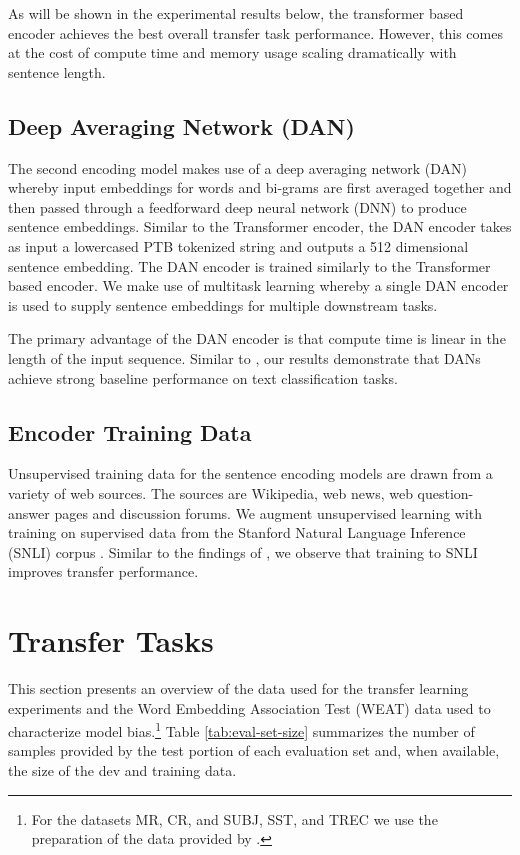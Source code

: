 \documentclass[11pt,a4paper]{article}
\begin{document}
As will be shown in the experimental results below, the transformer based encoder achieves the best overall transfer task performance. However, this comes at the cost of compute time and memory usage scaling dramatically with sentence length. 



\subsection{Deep Averaging Network (DAN)}

The second encoding model makes use of a deep averaging network (DAN) \cite{iyyer2015} whereby input embeddings for words and bi-grams are first averaged together and then passed through a feedforward deep neural network (DNN) to produce sentence embeddings.  
Similar to the Transformer encoder, the DAN encoder takes as input a lowercased PTB tokenized string and outputs a 512 dimensional sentence embedding. The DAN encoder is trained similarly to the Transformer based encoder. We make use of multitask learning whereby a single DAN encoder is used to supply sentence embeddings for multiple downstream tasks.

The primary advantage of the DAN encoder is that compute time is linear in the length of the input sequence. Similar to , our results demonstrate that DANs achieve strong baseline performance on text classification tasks. 


\subsection{Encoder Training Data}

Unsupervised training data for the sentence encoding models are drawn from a variety of web sources. The sources are Wikipedia, web news, web question-answer pages and discussion forums. We augment unsupervised learning with training on supervised data from the Stanford Natural Language Inference (SNLI) corpus \cite{bowman2015}. Similar to the findings of , we observe that training to SNLI improves transfer performance.

\section{Transfer Tasks}

This section presents an overview of the data used for the transfer learning experiments and the Word Embedding Association Test (WEAT) data used to characterize model bias.\footnote{For the datasets MR, CR, and SUBJ, SST, and TREC we use the preparation of the data provided by .} Table \ref{tab:eval-set-size} summarizes the number of samples provided by the test portion of each evaluation set and, when available, the size of the dev and training data.
\end{document}
